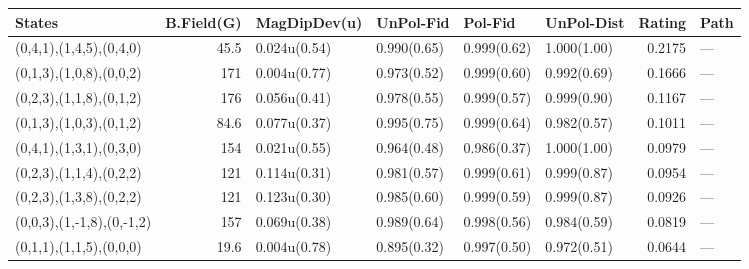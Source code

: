 \begin{tabular}{lrllllrl}
\hline
 States                    &   B.Field(G) & MagDipDev(u)   & UnPol-Fid   & Pol-Fid     & UnPol-Dist   &   Rating & Path   \\
\hline
 (0,4,1),(1,4,5),(0,4,0)   &         45.5 & 0.024u(0.54)   & 0.990(0.65) & 0.999(0.62) & 1.000(1.00)  &   0.2175 & ---    \\
 (0,1,3),(1,0,8),(0,0,2)   &        171   & 0.004u(0.77)   & 0.973(0.52) & 0.999(0.60) & 0.992(0.69)  &   0.1666 & ---    \\
 (0,2,3),(1,1,8),(0,1,2)   &        176   & 0.056u(0.41)   & 0.978(0.55) & 0.999(0.57) & 0.999(0.90)  &   0.1167 & ---    \\
 (0,1,3),(1,0,3),(0,1,2)   &         84.6 & 0.077u(0.37)   & 0.995(0.75) & 0.999(0.64) & 0.982(0.57)  &   0.1011 & ---    \\
 (0,4,1),(1,3,1),(0,3,0)   &        154   & 0.021u(0.55)   & 0.964(0.48) & 0.986(0.37) & 1.000(1.00)  &   0.0979 & ---    \\
 (0,2,3),(1,1,4),(0,2,2)   &        121   & 0.114u(0.31)   & 0.981(0.57) & 0.999(0.61) & 0.999(0.87)  &   0.0954 & ---    \\
 (0,2,3),(1,3,8),(0,2,2)   &        121   & 0.123u(0.30)   & 0.985(0.60) & 0.999(0.59) & 0.999(0.87)  &   0.0926 & ---    \\
 (0,0,3),(1,-1,8),(0,-1,2) &        157   & 0.069u(0.38)   & 0.989(0.64) & 0.998(0.56) & 0.984(0.59)  &   0.0819 & ---    \\
 (0,1,1),(1,1,5),(0,0,0)   &         19.6 & 0.004u(0.78)   & 0.895(0.32) & 0.997(0.50) & 0.972(0.51)  &   0.0644 & ---    \\
\hline
\end{tabular}